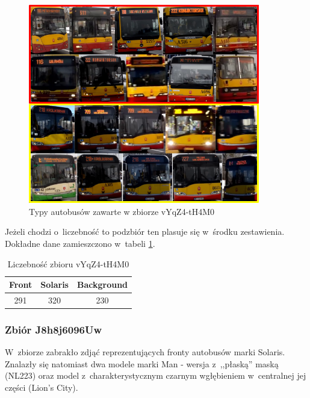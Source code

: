 \begin{figure}[!h]
    \centering
    \includegraphics[width=0.9\textwidth]{img/exp_trainig_data_vYq}
    \caption{Typy autobusów zawarte w zbiorze vYqZ4-tH4M0}
    \label{fig:vYqZ4-tH4M0_types}
\end{figure}

Jeżeli chodzi o~liczebność to podzbiór ten plasuje się w~środku 
zestawienia.
Dokładne dane zamieszczono w~tabeli \ref{tab:vYqZ4-tH4M0_count}.

\begin{table}[!h]
    \centering
    \begin{tabular}{c|c|c}
        Front   & Solaris   & Background \\ \hline
        291     & 320       & 230 
    \end{tabular}
    \caption{Liczebność zbioru vYqZ4-tH4M0}
    \label{tab:vYqZ4-tH4M0_count}
\end{table}

\newpage

\subsubsection{Zbiór J8h8j6096Uw}

W~zbiorze zabrakło zdjąć reprezentujących fronty autobusów marki
Solaris. Znalazły się natomiast dwa modele marki Man - wersja 
z~,,płaską'' maską (NL223) oraz model z~charakterystycznym czarnym
wgłębieniem w~centralnej jej części (Lion's City).


